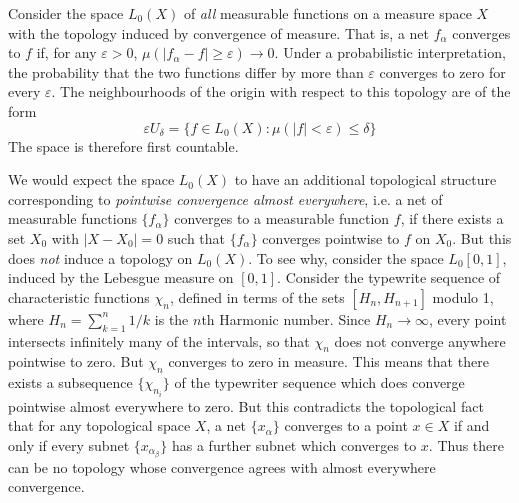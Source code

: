\begin{example}
    Consider the space $L_0(X)$ of {\it all} measurable functions on a measure space $X$ with the topology induced by convergence of measure. That is, a net $f_\alpha$ converges to $f$ if, for any $\varepsilon > 0$, $\mu ( |f_\alpha - f| \geq \varepsilon ) \to 0$. Under a probabilistic interpretation, the probability that the two functions differ by more than $\varepsilon$ converges to zero for every $\varepsilon$. The neighbourhoods of the origin with respect to this topology are of the form
    \[ \varepsilon U_\delta = \{ f \in L_0(X): \mu(|f| < \varepsilon) \leq \delta \} \]
    The space is therefore first countable.
\end{example}

\begin{example}
    We would expect the space $L_0(X)$ to have an additional topological structure corresponding to \emph{pointwise convergence almost everywhere}, i.e. a net of measurable functions $\{ f_\alpha \}$ converges to a measurable function $f$, if there exists a set $X_0$ with $|X - X_0| = 0$ such that $\{ f_\alpha \}$ converges pointwise to $f$ on $X_0$. But this does \emph{not} induce a topology on $L_0(X)$. To see why, consider the space $L_0[0,1]$, induced by the Lebesgue measure on $[0,1]$. Consider the typewrite sequence of characteristic functions $\chi_n$, defined in terms of the sets $[H_n, H_{n+1}]$ modulo 1, where $H_n = \sum_{k = 1}^n 1/k$ is the $n$th Harmonic number. Since $H_n \to \infty$, every point intersects infinitely many of the intervals, so that $\chi_n$ does not converge anywhere pointwise to zero. But $\chi_n$ converges to zero in measure. This means that there exists a subsequence $\{ \chi_{n_i} \}$ of the typewriter sequence which does converge pointwise almost everywhere to zero. But this contradicts the topological fact that for any topological space $X$, a net $\{ x_\alpha \}$ converges to a point $x \in X$ if and only if every subnet $\{ x_{\alpha_\beta} \}$ has a further subnet which converges to $x$. Thus there can be no topology whose convergence agrees with almost everywhere convergence.
\end{example}

